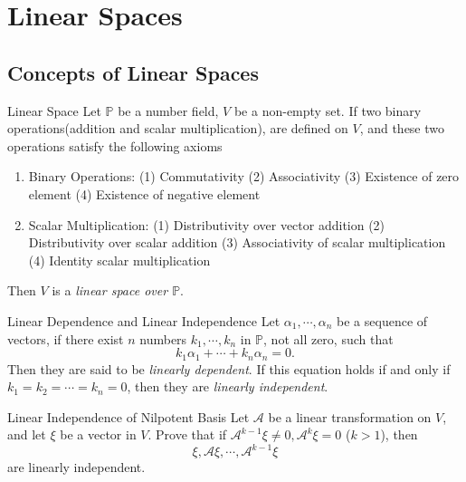 
\section{Linear Spaces}

\subsection{Concepts of Linear Spaces}

\begin{definition}{Linear Space}{}
  Let $\mathbb{P}$ be a number field, $V$ be a non-empty set.
  If two binary operations(addition and scalar multiplication),
  are defined on $V$, and these two operations satisfy the following axioms
  \begin{enumerate}
  \item Binary Operations: (1) Commutativity
    (2) Associativity (3) Existence of zero element (4) Existence of negative element
  \item Scalar Multiplication: (1) Distributivity over vector addition
    (2) Distributivity over scalar addition
    (3) Associativity of scalar multiplication
    (4) Identity scalar multiplication
  \end{enumerate}
  Then $V$ is a \emph{linear space over $\mathbb{P}$}.
\end{definition}

\begin{definition}{Linear Dependence and Linear Independence}{}
  Let $\alpha_1, \cdots, \alpha_n$ be a sequence of vectors,
  if there exist $n$ numbers $k_1, \cdots, k_n$ in $\mathbb{P}$, not all zero, such that
  \begin{equation}
    k_1 \alpha_1 + \cdots + k_n \alpha_n = 0.
  \end{equation}
  Then they are said to be \emph{linearly dependent}.
  If this equation holds if and only if $k_1 = k_2 = \cdots = k_n = 0$,
  then they are \emph{linearly independent}.
\end{definition}

\begin{example}{Linear Independence of Nilpotent Basis}{}
  Let $\mathcal{A}$ be a linear transformation on $V$,
  and let $\xi$ be a vector in $V$.
  Prove that if $\mathcal{A}^{k - 1}\xi \neq 0, \mathcal{A}^k \xi = 0$ ($k > 1$),
  then
  \begin{equation}
    \xi, \mathcal{A} \xi, \cdots, \mathcal{A}^{k-1}\xi
  \end{equation}
  are linearly independent.
\end{example}

